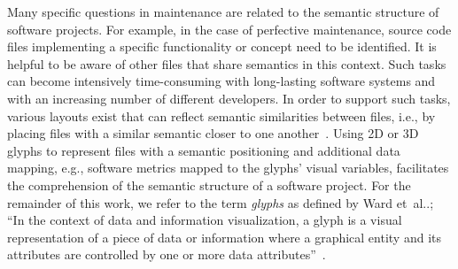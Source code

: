 \documentclass[runningheads]{llncs}
\makeatletter
\DeclareRobustCommand\onedot{\futurelet\@let@token\@onedot}
\def\@onedot{\ifx\@let@token.\else.\null\fi\xspace}
\def\etal{et~al\onedot}
\makeatother
\begin{document}
Many specific questions in maintenance are related to the semantic structure of software projects.
For example, in the case of perfective maintenance, source code files implementing a specific functionality or concept need to be identified.
It is helpful to be aware of other files that share semantics in this context.
Such tasks can become intensively time-consuming with long-lasting software systems and with an increasing number of different developers.
In order to support such tasks, various layouts exist that can reflect semantic similarities between files, i.e., by placing files with a similar semantic closer to one another~\cite{kuhn2008consistentlayout,kuhn2010software,atzberger2021softwareforest,atzberger2021-softwaregalaxy}.
Using 2D or 3D glyphs to represent files with a semantic positioning and additional data mapping, e.g., software metrics mapped to the glyphs' visual variables, facilitates the comprehension of the semantic structure of a software project.
For the remainder of this work, we refer to the term \emph{glyphs} as defined by Ward \etal; \enquote{In the context of data and information visualization, a glyph is a visual representation of a piece of data or information where a graphical entity and its attributes are controlled by one or more data attributes}~\cite{ward2010interactive}.
\end{document}
